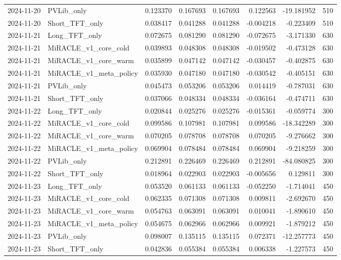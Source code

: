 \begin{tabular}{llrrrrrr}
2024-11-20 & PVLib_only & 0.123370 & 0.167693 & 0.167693 & 0.122563 & -19.181952 & 510 \\
2024-11-20 & Short_TFT_only & 0.038417 & 0.041288 & 0.041288 & -0.004218 & -0.223409 & 510 \\
2024-11-21 & Long_TFT_only & 0.072675 & 0.081290 & 0.081290 & -0.072675 & -3.171330 & 630 \\
2024-11-21 & MiRACLE_v1_core_cold & 0.039893 & 0.048308 & 0.048308 & -0.019502 & -0.473128 & 630 \\
2024-11-21 & MiRACLE_v1_core_warm & 0.035899 & 0.047142 & 0.047142 & -0.030457 & -0.402875 & 630 \\
2024-11-21 & MiRACLE_v1_meta_policy & 0.035930 & 0.047180 & 0.047180 & -0.030542 & -0.405151 & 630 \\
2024-11-21 & PVLib_only & 0.045473 & 0.053206 & 0.053206 & 0.014419 & -0.787031 & 630 \\
2024-11-21 & Short_TFT_only & 0.037066 & 0.048334 & 0.048334 & -0.036164 & -0.474711 & 630 \\
2024-11-22 & Long_TFT_only & 0.020844 & 0.025276 & 0.025276 & -0.015361 & -0.059774 & 300 \\
2024-11-22 & MiRACLE_v1_core_cold & 0.099586 & 0.107981 & 0.107981 & 0.099586 & -18.342289 & 300 \\
2024-11-22 & MiRACLE_v1_core_warm & 0.070205 & 0.078708 & 0.078708 & 0.070205 & -9.276662 & 300 \\
2024-11-22 & MiRACLE_v1_meta_policy & 0.069904 & 0.078484 & 0.078484 & 0.069904 & -9.218259 & 300 \\
2024-11-22 & PVLib_only & 0.212891 & 0.226469 & 0.226469 & 0.212891 & -84.080825 & 300 \\
2024-11-22 & Short_TFT_only & 0.018964 & 0.022903 & 0.022903 & -0.005656 & 0.129811 & 300 \\
2024-11-23 & Long_TFT_only & 0.053520 & 0.061133 & 0.061133 & -0.052250 & -1.714041 & 450 \\
2024-11-23 & MiRACLE_v1_core_cold & 0.062335 & 0.071308 & 0.071308 & 0.009811 & -2.692670 & 450 \\
2024-11-23 & MiRACLE_v1_core_warm & 0.054763 & 0.063091 & 0.063091 & 0.010041 & -1.890610 & 450 \\
2024-11-23 & MiRACLE_v1_meta_policy & 0.054675 & 0.062966 & 0.062966 & 0.009921 & -1.879212 & 450 \\
2024-11-23 & PVLib_only & 0.098007 & 0.135115 & 0.135115 & 0.072371 & -12.257773 & 450 \\
2024-11-23 & Short_TFT_only & 0.042836 & 0.055384 & 0.055384 & 0.006338 & -1.227573 & 450 \\

\end{tabular}
